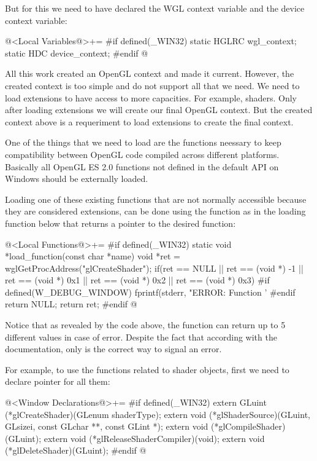 But for this we need to have declared the WGL context variable and the
device context variable:

@<Local Variables@>+=
#if defined(_WIN32)
static HGLRC wgl_context;
static HDC device_context;
#endif
@
\fimcodigo

All this work created an OpenGL context and made it current. However,
the created context is too simple and do not support all that we
need. We need to load extensions to have access to more
capacities. For example, shaders. Only after loading extensions we
will create our final OpenGL context. But the created context above is
a requeriment to load extensions to create the final context.

One of the things that we need to load are the functions neessary to
keep compatibility between OpenGL code compiled across different
platforms. Basically all OpenGL ES 2.0 functions not defined in the
default API on Windows should be externally loaded.

Loading one of these existing functions that are not normally
accessible because they are considered extensions, can be done using
the function  as in the loading function
below that returns a pointer to the desired function:

\iniciocodigo
@<Local Functions@>+=
#if defined(_WIN32)
static void *load_function(const char *name){
  void *ret = wglGetProcAddress("glCreateShader");
  if(ret == NULL || ret == (void *) -1 || ret == (void *) 0x1 ||
     ret == (void *) 0x2 || ret == (void *) 0x3){
#if defined(W_DEBUG_WINDOW)
    fprintf(stderr, "ERROR: Function '%
#endif
    return NULL;
  }
  return ret;
}
#endif
@
\fimcodigo

Notice that as revealed by the code above, the
function  can return up to 5 different
values in case of error. Despite the fact that according with the
documentation, only  is the correct way to signal an
error.

For example, to use the functions related to shader objects, first we
need to declare pointer for all them:

\iniciocodigo
@<Window Declarations@>+=
#if defined(_WIN32)
extern GLuint (*glCreateShader)(GLenum shaderType);
extern void (*glShaderSource)(GLuint, GLsizei, const GLchar **, const GLint *);
extern void (*glCompileShader)(GLuint);
extern void (*glReleaseShaderCompiler)(void);
extern void (*glDeleteShader)(GLuint);
#endif
@
\fimcodigo

